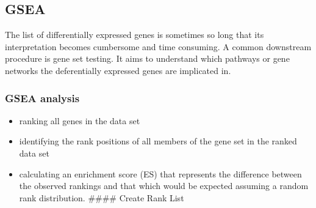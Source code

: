 \documentclass[
]{article}
\newenvironment{Shaded}{\begin{snugshade}}{\end{snugshade}}
\newcommand{\DataTypeTok}[1]{\textcolor[rgb]{0.13,0.29,0.53}{#1}}
\newcommand{\DecValTok}[1]{\textcolor[rgb]{0.00,0.00,0.81}{#1}}
\newcommand{\FloatTok}[1]{\textcolor[rgb]{0.00,0.00,0.81}{#1}}
\newcommand{\KeywordTok}[1]{\textcolor[rgb]{0.13,0.29,0.53}{\textbf{#1}}}
\newcommand{\NormalTok}[1]{#1}
\newcommand{\OperatorTok}[1]{\textcolor[rgb]{0.81,0.36,0.00}{\textbf{#1}}}
\newcommand{\StringTok}[1]{\textcolor[rgb]{0.31,0.60,0.02}{#1}}
\providecommand{\tightlist}{%
  \setlength{\itemsep}{0pt}\setlength{\parskip}{0pt}}
\begin{document}
\begin{Shaded}
\end{Shaded}

\hypertarget{gsea}{%
\subsection{GSEA}\label{gsea}}

The list of differentially expressed genes is sometimes so long that its
interpretation becomes cumbersome and time consuming. A common
downstream procedure is gene set testing. It aims to understand which
pathways or gene networks the deferentially expressed genes are
implicated in.

\hypertarget{gsea-analysis}{%
\subsubsection{GSEA analysis}\label{gsea-analysis}}

\begin{itemize}
\tightlist
\item
  ranking all genes in the data set
\item
  identifying the rank positions of all members of the gene set in the
  ranked data set
\item
  calculating an enrichment score (ES) that represents the difference
  between the observed rankings and that which would be expected
  assuming a random rank distribution. \#\#\#\# Create Rank List
\end{itemize}

\begin{Shaded}
\end{Shaded}
\end{document}
